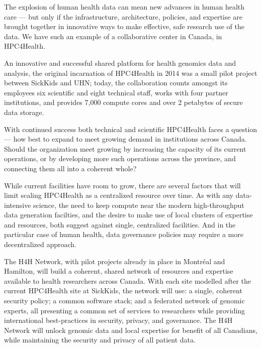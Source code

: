 \documentclass[twoside,symmetric,sfsidenotes,notoc]{tufte-book}
\begin{document}
\begin{fullwidth}
The explosion of human health data can mean new advances in human health care ---
but only if the infrastructure, architecture, policies, and expertise are brought
together in innovative ways to make effective, safe research use of the data.
We have such an example of a collaborative center in Canada, in HPC4Health.

An innovative and successful shared platform for health genomics data and analysis,
the original incarnation of HPC4Health in 2014 was a small pilot project between
SickKids and UHN; today, the collaboration counts amongst its employees six scientific 
and eight technical staff, works with four partner institutions, and provides 7,000
compute cores and over 2 petabytes of secure data storage.

With continued success both technical and scientific HPC4Health faces a question --- 
how best to expand to meet growing demand in institutions across Canada.  Should 
the organization meet growing by increasing the capacity of its current operations,
or by developing more such operations across the province, and connecting them
all into a coherent whole?

While current facilities have room to grow, there are several factors that will limit
scaling HPC4Health as a centralized resource over time.  As with any data-intensive science,
the need to keep compute near the modern high-throughput data generation facilties,
and the desire to make use of local clusters of expertise and resources, both suggest
against single, centralized facilities.  And in the particular case of human health, 
data governance policies may require a more decentralized approach.

The H4H Network, with pilot projects already in place in Montr\'eal and
Hamilton, will build a coherent, shared network of resources and expertise available
to health researchers across Canada.  With each site modelled after the current HPC4Health
site at SickKids, the network will use: a single, coherent security policy; a common
software stack; and a federated network of genomic experts, all presenting a common
set of services to researchers while providing international best-practices in security, privacy,
and governance.  The H4H Network will unlock genomic data and local expertise for
benefit of all Canadians, while maintaining the security and privacy of all
patient data.
\end{fullwidth}

\mainmatter
\end{document}
